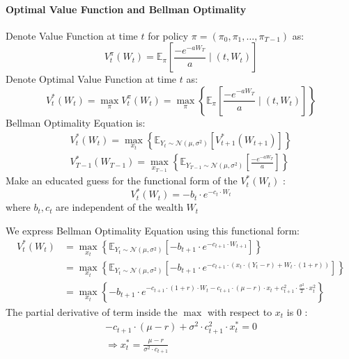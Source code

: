 \documentclass[11pt]{article}
\begin{document}
\paragraph*{Optimal Value Function and Bellman Optimality}
Denote Value Function at time $t$ for policy $\pi=\left(\pi_0, \pi_1, \ldots, \pi_{T-1}\right)$ as:
$$
V_t^\pi\left(W_t\right)=\mathbb{E}_\pi\left[\frac{-e^{-a W_T}}{a} \mid\left(t, W_t\right)\right]
$$
Denote Optimal Value Function at time $t$ as:
$$
V_t^*\left(W_t\right)=\max _\pi V_t^\pi\left(W_t\right)=\max _\pi\left\{\mathbb{E}_\pi\left[\frac{-e^{-a W_T}}{a} \mid\left(t, W_t\right)\right]\right\}
$$
Bellman Optimality Equation is:
$$
\begin{gathered}
V_t^*\left(W_t\right)=\max _{x_t}\left\{\mathbb{E}_{Y_t \sim \mathcal{N}\left(\mu, \sigma^2\right)}\left[V_{t+1}^*\left(W_{t+1}\right)\right]\right\} \\
V_{T-1}^*\left(W_{T-1}\right)=\max _{x_{T-1}}\left\{\mathbb{E}_{Y_{T-1} \sim \mathcal{N}\left(\mu, \sigma^2\right)}\left[\frac{-e^{-a W_T}}{a}\right]\right\}
\end{gathered}
$$
Make an educated guess for the functional form of the $V_t^*\left(W_t\right)$ :
$$
V_t^*\left(W_t\right)=-b_t \cdot e^{-c_t \cdot W_t}
$$
where $b_t, c_t$ are independent of the wealth $W_t$

We express Bellman Optimality Equation using this functional form:
$$
\begin{aligned}
V_t^*\left(W_t\right) & =\max _{x_t}\left\{\mathbb{E}_{Y_t \sim \mathcal{N}\left(\mu, \sigma^2\right)}\left[-b_{t+1} \cdot e^{-c_{t+1} \cdot W_{t+1}}\right]\right\} \\
& =\max _{x_t}\left\{\mathbb{E}_{Y_t \sim \mathcal{N}\left(\mu, \sigma^2\right)}\left[-b_{t+1} \cdot e^{-c_{t+1} \cdot\left(x_t \cdot\left(Y_t-r\right)+W_t \cdot(1+r)\right)}\right]\right\} \\
& =\max _{x_t}\left\{-b_{t+1} \cdot e^{-c_{t+1} \cdot(1+r) \cdot W_t-c_{t+1} \cdot(\mu-r) \cdot x_t+c_{t+1}^2 \cdot \frac{\sigma^2}{2} \cdot x_t^2}\right\}
\end{aligned}
$$
The partial derivative of term inside the $\max$ with respect to $x_t$ is 0 :
$$
\begin{gathered}
-c_{t+1} \cdot(\mu-r)+\sigma^2 \cdot c_{t+1}^2 \cdot x_t^*=0 \\
\Rightarrow x_t^*=\frac{\mu-r}{\sigma^2 \cdot c_{t+1}}
\end{gathered}
$$
\end{document}

